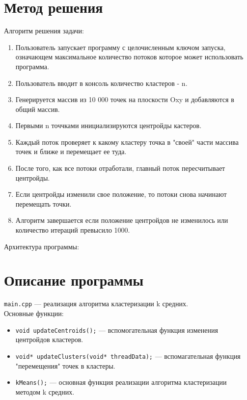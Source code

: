 \section{Метод решения}

Алгоритм решения задачи:

\begin{enumerate}
\item Пользователь запускает программу с целочисленным ключом запуска, означающем максимальное количество потоков которое может использовать программа.

\item Пользователь вводит в консоль количество кластеров - n.

\item Генерируется массив из 10 000 точек на плоскости Oxy и добавляются в общий массив.

\item Первыми n точчками инициализируются центройды кастеров. 

\item Каждый поток проверяет к какому кластеру точка в "своей" части массива точек и ближе и перемещает ее туда.

\item После того, как все потоки отработали, главный поток пересчитывает центройды.

\item Если центройды изменили свое положение, то потоки снова начинают перемещать точки.

\item Алгоритм завершается если положение центройдов не изменилось или количество итераций превысило 1000.

\end{enumerate}

\vspace{1\baselineskip}

Архитектура программы:


\section{Описание программы}

\texttt{main.cpp} --- реализация алгоритма кластеризации k средних. \\
Основные функции:
\begin{itemize}
\item \texttt{void updateCentroids();} --- вспомогательная функция изменения центройдов кластеров.
\item \texttt{void* updateClusters(void* threadData);} --- вспомагательная функция "перемещения" точек в кластеры.
\item \texttt{kMeans();} --- основная функция реализации алгоритма кластеризации методом k средних.
\end{itemize}


